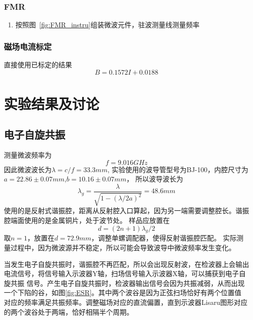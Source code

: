 \documentclass[10pt]{ctexart}
\begin{document}
\subsubsection{FMR}
\begin{enumerate}
    \item 按照图~\ref{fig:FMR_instru}组装微波元件，驻波测量线测量频率
\end{enumerate}
\subsubsection{磁场电流标定}
直接使用已标定的结果
\[B=0.1572I+0.0188\]
\section{实验结果及讨论}
\subsection{电子自旋共振}
测量微波频率为
\[f=9.016GHz\]
因此微波波长为$\lambda=c/f=33.3mm$,
实验使用的波导管型号为BJ-100，内腔尺寸为$a=22.86\pm0.07mm$,$b=10.16\pm0.07mm$，
所以波导波长为
\[\lambda_g=\frac{\lambda}{\sqrt{1-(\lambda/2a)^2}}=48.6mm\]
使用的是反射式谐振腔，距离从反射腔入口算起，因为另一端需要调整腔长。谐振腔端面使用的是金属铜片，处于波节处。
样品应放置在
\[d=(2n+1)\lambda_g/2\]
取$n=1$，放置在$d=72.9mm$，调整单螺调配器，使得反射谐振腔匹配。
实际测量过程中，因为微波源并不稳定，所以可能会导致波导中微波频率发生变化。

当发生电子自旋共振时，谐振腔不再匹配，所以会出现反射波，在检波器上会输出电流信号，将信号输入示波器Y轴，扫场信号输入示波器X轴，可以捕获到电子自旋共振
信号。产生电子自旋共振时，检波器输出信号会因为共振减弱，从而出现一个下陷的谷，如图\ref{fig:ESR}。其中两个波谷是因为正弦扫场恰好有两个位置值
对应的频率满足共振频率。调整磁场对应的直流偏置，直到示波器Lisaru图形对应的两个波谷处于两端，恰好相隔半个周期。
\end{document}

